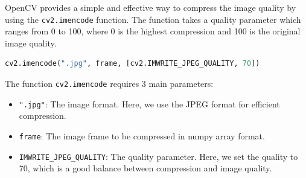 OpenCV provides a simple and effective way to compress the image quality by using the \texttt{cv2.imencode} function. The function takes a quality parameter which ranges from 0 to 100, where 0 is the highest compression and 100 is the original image quality.

\begin{lstlisting}[language=python, caption={Image compression with OpenCV}]
cv2.imencode(".jpg", frame, [cv2.IMWRITE_JPEG_QUALITY, 70])
\end{lstlisting}

The function \texttt{cv2.imencode} requires 3 main parameters:
\begin{itemize}
    \item \texttt{".jpg"}: The image format. Here, we use the JPEG format for efficient compression.
    \item \texttt{frame}: The image frame to be compressed in numpy array format.
    \item \texttt{IMWRITE\_JPEG\_QUALITY}: The quality parameter. Here, we set the quality to 70, which is a good balance between compression and image quality.
\end{itemize}

